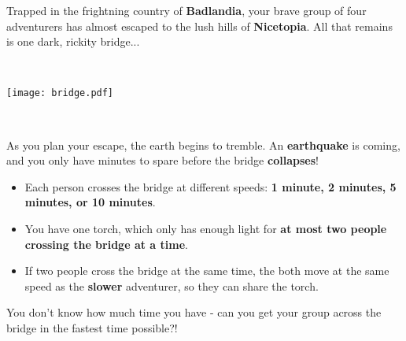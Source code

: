 
\newcommand{\activityname}{
  Math Abridged
}
\newcommand{\subtitle}{
  An Optimal Optimization Puzzle
}


Trapped in the frightning country of \textbf{Badlandia}, your brave group of four adventurers has almost escaped to the lush hills of \textbf{Nicetopia}. All that remains is one dark, rickity bridge...

\

\centerline{\texttt{[image: bridge.pdf]}}

\

As you plan your escape, the earth begins to tremble. An \textbf{earthquake} is coming, and you only have minutes to spare before the bridge \textbf{collapses}!

\begin{itemize}
\item Each person crosses the bridge at different speeds: \textbf{1 minute, 2 minutes, 5 minutes, or 10 minutes}.
\item You have one torch, which only has enough light for \textbf{at most two people crossing the bridge at a time}.
\item If two people cross the bridge at the same time, the both move at the same speed as the \textbf{slower} adventurer, so they can share the torch.
\end{itemize}

You don't know how much time you have - can you get your group across the bridge in the fastest time possible?!

